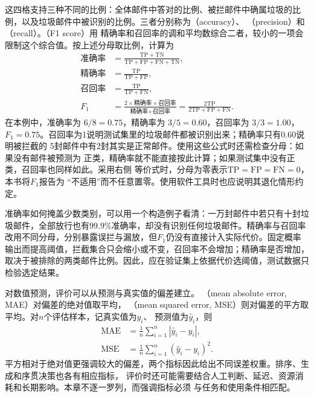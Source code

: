 这四格支持三种不同的比例：全体邮件中答对的比例、被拦邮件中确属垃圾的比例，以及垃圾邮件中被识别的比例。三者分别称为（accuracy）、
（precision）和（recall）。（F1 score）用
精确率和召回率的调和平均数综合二者，较小的一项会限制这个综合值。按上述分母取比例，计算为
\begin{align}
  \text{准确率}
    &=\frac{\mathrm{TP}+\mathrm{TN}}
      {\mathrm{TP}+\mathrm{FP}+\mathrm{FN}+\mathrm{TN}},\\
  \text{精确率}
    &=\frac{\mathrm{TP}}{\mathrm{TP}+\mathrm{FP}},\\
  \text{召回率}
    &=\frac{\mathrm{TP}}{\mathrm{TP}+\mathrm{FN}},\\
  F_1
    &=\frac{2\times\text{精确率}\times\text{召回率}}
      {\text{精确率}+\text{召回率}}
      =\frac{2\mathrm{TP}}{2\mathrm{TP}+\mathrm{FP}+\mathrm{FN}}.
  \label{eq:classification-measures}
\end{align}
在本例中，准确率为 $6/8=0.75$，精确率为 $3/5=0.60$，召回率为 $3/3=1.00$，
$F_1=0.75$。召回率为1说明测试集里的垃圾邮件都被识别出来；精确率只有0.60说明被拦截的
5封邮件中有2封其实是正常邮件。使用这些公式时还需检查分母：如果没有邮件被预测为
正类，精确率就不能直接按此计算；如果测试集中没有正类，召回率也同样如此。采用右侧
等价式时，分母为零表示$\mathrm{TP}=\mathrm{FP}=\mathrm{FN}=0$，本书将$F_1$报告为
“不适用”而不任意置零。使用软件工具时也应说明其退化情形约定。

准确率如何掩盖少数类别，可以用一个构造例子看清：一万封邮件中若只有十封垃圾邮件，全部放行也有$99.9\%$准确率，却没有识别任何垃圾邮件。精确率与召回率改用不同分母，分别暴露误拦与漏放，但$F_1$仍没有直接计入实际代价。固定概率输出而提高阈值，拦截集合只会缩小或不变，召回率不会增加；精确率是否增加，取决于被排除的两类邮件比例。因此，应在验证集上依据代价选阈值，测试数据只检验选定结果。

对数值预测，评价可以从预测与真实值的偏差建立。
（mean absolute error, MAE）对偏差的绝对值取平均，
（mean squared error, MSE）则对偏差的平方取平均。对$n$个评估样本，记真实值为$y_i$、
预测值为$\hat{y}_i$，则
\begin{align}
  \operatorname{MAE}
    &=\frac{1}{n}\sum_{i=1}^{n}|\hat{y}_i-y_i|,\\
  \operatorname{MSE}
    &=\frac{1}{n}\sum_{i=1}^{n}(\hat{y}_i-y_i)^2.
\end{align}
平方相对于绝对值更强调较大的偏差，两个指标因此给出不同误差权重。排序、生成和序贯决策也各有相应指标，
评价时还可能需要结合人工判断、延迟、资源消耗和长期影响。本章不逐一罗列，而强调指标必须
与任务和使用条件相匹配。

